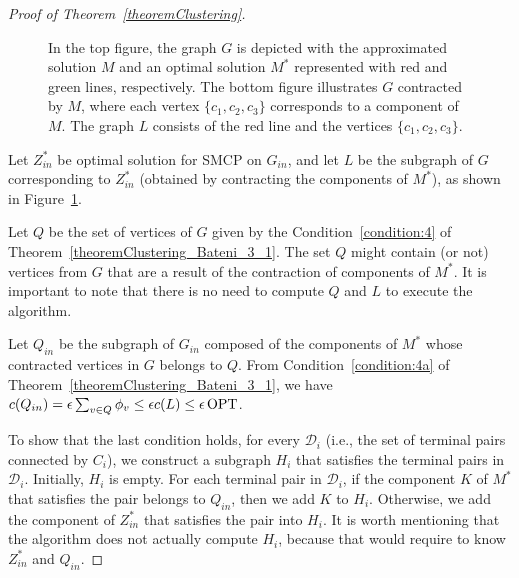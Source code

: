 \begin{proof}[Proof of Theorem~\ref{theoremClustering}]
\begin{figure}[H]

    \caption{In the top figure, the graph \(G\) is depicted with the approximated solution \(M\) and an optimal solution \(M^\ast\) represented with red and green lines, respectively. The bottom figure illustrates \(G\) contracted by \(M\), where each vertex \(\{c_1, c_2, c_3\}\) corresponds to a component of \(M\). The graph \(L\) consists of the red line and the vertices \(\{c_1, c_2, c_3\}\).}
    \label{fig:theorem_clustering_opt_contracted}
\end{figure}


Let \(Z_{in}^\ast\) be optimal solution for SMCP on \(G_{in}\), and let \(L\) be the subgraph of \(G\) corresponding to \(Z_{in}^\ast\) (obtained by contracting the components of \(M^\ast\)), as shown in Figure~\ref{fig:theorem_clustering_opt_contracted}. 

Let \(Q\) be the set of vertices of \(G\) given by the Condition~\eqref{condition:4} of Theorem~\ref{theoremClustering_Bateni_3_1}. The set \(Q\) might contain (or not) vertices from \(G\) that are a result of the contraction of components of \(M^\ast\). It is important to note that there is no need to compute \(Q\) and \(L\) to execute the algorithm. 

Let \(Q_{in}\) be the subgraph of \(G_{in}\) composed of the components of \(M^\ast\) whose contracted vertices in \(G\) belongs to \(Q\). From Condition~\eqref{condition:4a} of Theorem~\ref{theoremClustering_Bateni_3_1}, we have \(c(Q_{in}) = \epsilon \sum_{v \in Q} \phi_v \leq \epsilon c(L) \leq \epsilon \operatorname{\textrm{OPT}}\).

To show that the last condition holds, for every \(\mathcal{D}_i\) (i.e., the set of terminal pairs connected by \(C_i\)), we construct a subgraph \(H_i\) that satisfies the terminal pairs in \(\mathcal{D}_i\). Initially, \(H_i\) is empty. For each terminal pair in \(\mathcal{D}_i\), if the component \(K\) of \(M^\ast\) that satisfies the pair belongs to \(Q_{in}\), then we add \(K\) to \(H_i\). Otherwise, we add the component of \(Z_{in}^\ast\) that satisfies the pair into \(H_i\). It is worth mentioning that the algorithm does not actually compute \(H_i\), because that would require to know \(Z_{in}^\ast\) and \(Q_{in}\).


\end{proof}

